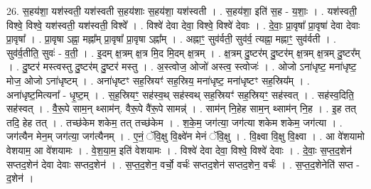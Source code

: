 \documentclass[17pt]{extarticle}
\begin{document}
26. स॒हय॑शा॒ यश॑स्वती॒ यश॑स्वती स॒हय॑शाः स॒हय॑शा॒ यश॑स्वती । . स॒हय॑शा॒ इति॑ स॒ह - य॒शाः॒ । . यश॑स्वती॒ विश्वे॒ विश्वे॒ यश॑स्वती॒ यश॑स्वती॒ विश्वे᳚ । . विश्वे॑ देवा देवा॒ विश्वे॒ विश्वे॑ देवाः । . दे॒वाः॒ प्रा॒वृषा᳚ प्रा॒वृषा॑ देवा देवाः प्रा॒वृषा᳚ । . प्रा॒वृषा ऽह्ना॒ मह्ना᳚म् प्रा॒वृषा᳚ प्रा॒वृषा ऽह्ना᳚म् । . अह्नाꣳ॒॒ सुव॑र्वती॒ सुव॑र्व॒ त्यह्ना॒ मह्नाꣳ॒॒ सुव॑र्वती । . सुव॑र्व॒तीति॒ सुवः॑ - व॒ती॒ । . इ॒दम् क्ष॒त्रम् क्ष॒त्र मि॒द मि॒दम् क्ष॒त्रम् । . क्ष॒त्रम् दु॒ष्टर॑म् दु॒ष्टर॑म् क्ष॒त्रम् क्ष॒त्रम् दु॒ष्टर᳚म् । . दु॒ष्टर॑ मस्त्वस्तु दु॒ष्टर॑म् दु॒ष्टर॑ मस्तु । . अ॒स्त्वोज॒ ओजो॑ अस्त्व॒ स्त्वोजः॑ । . ओजो ऽना॑धृष्ट॒ मना॑धृष्ट॒ मोज॒ ओजो ऽना॑धृष्टम् । . अना॑धृष्टꣳ सह॒स्रियꣳ॑ सह॒स्रिय॒ मना॑धृष्ट॒ मना॑धृष्टꣳ सह॒स्रिय᳚म् । . अना॑धृष्ट॒मित्यना᳚ - धृ॒ष्ट॒म् । . स॒ह॒स्रियꣳ॒॒ सह॑स्व॒थ् सह॑स्वथ् सह॒स्रियꣳ॑ सह॒स्रियꣳ॒॒ सह॑स्वत् । . सह॑स्व॒दिति॒ सह॑स्वत् । . वै॒रू॒पे साम॒न् थ्साम॑न्. वैरू॒पे वै॑रू॒पे सामन्न्॑ । . साम॑न् नि॒हेह साम॒न् थ्साम॑न् नि॒ह । . इ॒ह तत् तदि॒ हेह तत् । . तच्छ॑केम शकेम॒ तत् तच्छ॑केम । . श॒के॒म॒ जग॑त्या॒ जग॑त्या शकेम शकेम॒ जग॑त्या । . जग॑त्यैन मेन॒म् जग॑त्या॒ जग॑त्यैनम् । . ए॒नं॒ ॅवि॒क्षु वि॒क्ष्वे॑न मेनं ॅवि॒क्षु । . वि॒क्ष्वा वि॒क्षु वि॒क्ष्वा । . आ वे॑शयामो वेशयाम॒ आ वे॑शयामः । . वे॒श॒या॒म॒ इति॑ वेशयामः । . विश्वे॑ देवा देवा॒ विश्वे॒ विश्वे॑ देवाः । . दे॒वाः॒ स॒प्त॒द॒शेन॑ सप्तद॒शेन॑ देवा देवाः सप्तद॒शेन॑ । . स॒प्त॒द॒शेन॒ वर्चो॒ वर्चः॑ सप्तद॒शेन॑ सप्तद॒शेन॒ वर्चः॑ । . स॒प्त॒द॒शेनेति॑ सप्त - द॒शेन॑ । \newline
\end{document}
